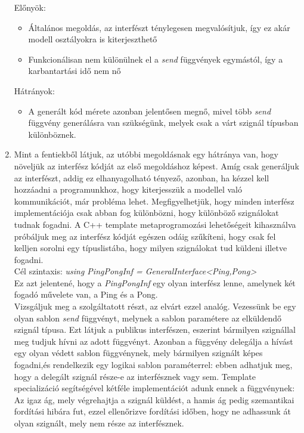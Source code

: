\documentclass[a4paper,12pt]{report}
\begin{document}
\begin{enumerate}
Előnyök:
\begin{itemize}
\item Általános megoldás, az interfészt ténylegesen megvalósítjuk, így ez akár modell osztályokra is kiterjeszthető
\item Funkcionálisan nem különülnek el a \textit{send} függvények egymástól, így a karbantartási idő nem nő
\end{itemize}
Hátrányok:
\begin{itemize}
\item A generált kód mérete azonban jelentősen megnő, mivel több \textit{send} függvény generálásra van szükségünk, melyek csak a várt szignál típusban különböznek.
\end{itemize}
\item Mint a fentiekből látjuk, az utóbbi megoldásnak egy hátránya van, hogy növeljük az interfész kódját az első megoldáshoz képest. Amíg csak generáljuk az interfészt, addig ez elhanyagolható tényező, azonban, ha kézzel kell hozzáadni a programunkhoz, hogy kiterjesszük a modellel való kommunikációt, már probléma lehet. Megfigyelhetjük, hogy minden interfész implementációja csak abban fog különbözni, hogy különböző szignálokat tudnak fogadni. A C++ template metaprogramozási lehetőségeit kihasználva próbáljuk meg az interfész kódját egészen odáig szűkíteni, hogy csak fel kelljen sorolni egy típuslistába, hogy milyen szignálokat tud küldeni illetve fogadni. \\
Cél szintaxis: \textit{using PingPongInf = GeneralInterface<Ping,Pong>} \\
Ez azt jelentené, hogy a \textit{PingPongInf} egy olyan interfész lenne, amelynek két fogadó művelete van, a Ping és a Pong.\\
Vizsgáljuk meg a szolgáltatott részt, az elvárt ezzel analóg. Vezessünk be egy olyan sablon \textit{send} függvényt, melynek a sablon paramétere az elküldendő szignál típusa. Ezt látjuk a publikus interfészen, eszerint bármilyen szignállal meg tudjuk hívni az adott függvényt. Azonban a függvény delegálja a hívást egy olyan védett sablon függvénynek, mely bármilyen szignált képes fogadni,és rendelkezik egy logikai sablon paraméterrel: ebben adhatjuk meg, hogy a delegált szignál része-e az interfésznek vagy sem. 
Template specializáció segítségével kétféle implementációt adunk ennek a függvénynek: Az igaz ág, mely végrehajtja a szignál küldést, a hamis ág pedig szemantikai fordítási hibára fut, ezzel ellenőrizve fordítási időben, hogy ne adhassunk át olyan szignált, mely nem része az interfésznek. \\

\end{enumerate}
\end{document}
